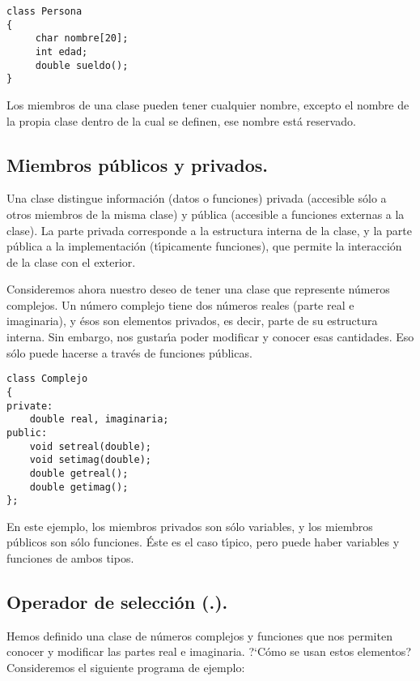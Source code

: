 \begin{verbatim}
class Persona
{
     char nombre[20];
     int edad;
     double sueldo();
}
\end{verbatim}

Los miembros de una clase pueden tener cualquier nombre, excepto el
nombre de la propia clase dentro de la cual se definen, ese nombre
est{\'a} reservado.

\subsection{Miembros p{\'u}blicos y privados.}

Una clase distingue informaci{\'o}n (datos o funciones) privada
(accesible s{\'o}lo a otros miembros de la misma clase) y p{\'u}blica
(accesible a funciones externas a la clase). La parte privada
corresponde a la estructura interna de la clase, y la parte p{\'u}blica
a la implementaci{\'o}n (t\'{\i}picamente funciones), que permite la
interacci{\'o}n de la clase con el exterior.

Consideremos ahora nuestro deseo de tener una clase que represente
n{\'u}meros complejos. Un n{\'u}mero complejo tiene dos n{\'u}meros reales (parte
real e imaginaria), y {\'e}sos son elementos privados, es decir, parte
de su estructura interna. Sin embargo, nos gustar{\'\i}a poder modificar
y conocer esas cantidades. Eso s{\'o}lo puede hacerse a trav{\'e}s de
funciones p{\'u}blicas.
\begin{verbatim}
class Complejo
{
private:
    double real, imaginaria;
public:
    void setreal(double);
    void setimag(double);
    double getreal();
    double getimag();
};
\end{verbatim}
En este ejemplo, los miembros privados son s{\'o}lo variables, y los
miembros p{\'u}blicos son s{\'o}lo funciones. {\'E}ste es el caso t{\'\i}pico, pero
puede haber variables y funciones de ambos tipos.

\subsection{Operador de selecci{\'o}n (.).}

Hemos definido una clase de n{\'u}meros complejos y funciones que nos
permiten conocer y modificar las partes real e imaginaria. ?`C{\'o}mo
se usan estos elementos? Consideremos el siguiente programa de
ejemplo:

